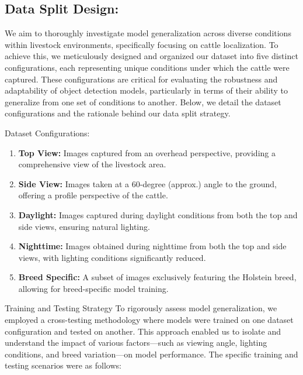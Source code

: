 \subsection{Data Split Design:}
We aim to thoroughly investigate model generalization across diverse conditions within livestock environments, specifically focusing on cattle localization. To achieve this, we meticulously designed and organized our dataset into five distinct configurations, each representing unique conditions under which the cattle were captured. These configurations are critical for evaluating the robustness and adaptability of object detection models, particularly in terms of their ability to generalize from one set of conditions to another. Below, we detail the dataset configurations and the rationale behind our data split strategy.

Dataset Configurations:
\begin{enumerate}
 \item\textbf{Top View:} Images captured from an overhead perspective, providing a comprehensive view of the livestock area.
 \item\textbf{Side View:} Images taken at a 60-degree (approx.) angle to the ground, offering a profile perspective of the cattle.
 \item\textbf{Daylight:} Images captured during daylight conditions from both the top and side views, ensuring natural lighting.
 \item\textbf{Nighttime:} Images obtained during nighttime from both the top and side views, with lighting conditions significantly reduced.
 \item\textbf{Breed Specific:} A subset of images exclusively featuring the Holstein breed, allowing for breed-specific model training.
 \end{enumerate}
Training and Testing Strategy
To rigorously assess model generalization, we employed a cross-testing methodology where models were trained on one dataset configuration and tested on another. This approach enabled us to isolate and understand the impact of various factors—such as viewing angle, lighting conditions, and breed variation—on model performance. The specific training and testing scenarios were as follows:
